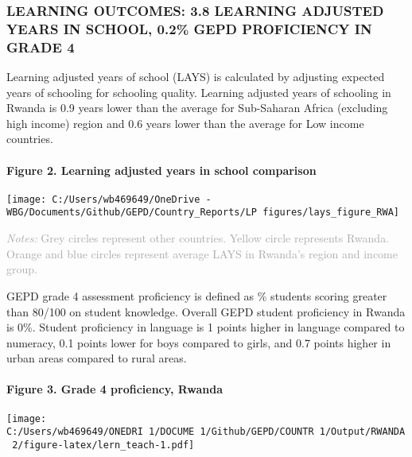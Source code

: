 \documentclass[twocolumn]{article}
\let\oldparagraph\paragraph
\renewcommand{\paragraph}[1]{\oldparagraph{#1}\mbox{}}
\begin{document}
\hypertarget{learning-outcomes-3.8-learning-adjusted-years-in-school-0.2-gepd-proficiency-in-grade-4}{%
\subsubsection{\texorpdfstring{\textbf{LEARNING OUTCOMES: 3.8 LEARNING
ADJUSTED YEARS IN SCHOOL, 0.2\% GEPD PROFICIENCY IN GRADE
4}}{LEARNING OUTCOMES: 3.8 LEARNING ADJUSTED YEARS IN SCHOOL, 0.2\% GEPD PROFICIENCY IN GRADE 4}}\label{learning-outcomes-3.8-learning-adjusted-years-in-school-0.2-gepd-proficiency-in-grade-4}}

Learning adjusted years of school (LAYS) is calculated by adjusting
expected years of schooling for schooling quality. Learning adjusted
years of schooling in Rwanda is 0.9 years lower than the average for
Sub-Saharan Africa (excluding high income) region and 0.6 years lower
than the average for Low income countries.

\hypertarget{figure-2.-learning-adjusted-years-in-school-comparison}{%
\paragraph{Figure 2. Learning adjusted years in school
comparison}\label{figure-2.-learning-adjusted-years-in-school-comparison}}

\texttt{[image: C:/Users/wb469649/OneDrive - WBG/Documents/Github/GEPD/Country\_Reports/LP figures/lays\_figure\_RWA]}

{\scriptsize
    \textcolor{darkgray}{\textit{Notes:} Grey circles represent other countries. Yellow circle represents Rwanda. Orange and blue circles represent average LAYS in Rwanda's region and income group.}
  }

GEPD grade 4 assessment proficiency is defined as \% students scoring
greater than 80/100 on student knowledge. Overall GEPD student
proficiency in Rwanda is 0\%. Student proficiency in language is 1
points higher in language compared to numeracy, 0.1 points lower for
boys compared to girls, and 0.7 points higher in urban areas compared to
rural areas. \vfill\null

\hypertarget{figure-3.-grade-4-proficiency-rwanda}{%
\paragraph{Figure 3. Grade 4 proficiency,
Rwanda}\label{figure-3.-grade-4-proficiency-rwanda}}

\texttt{[image: C:/Users/wb469649/ONEDRI~1/DOCUME~1/Github/GEPD/COUNTR~1/Output/RWANDA~2/figure-latex/lern\_teach-1.pdf]}
\end{document}
